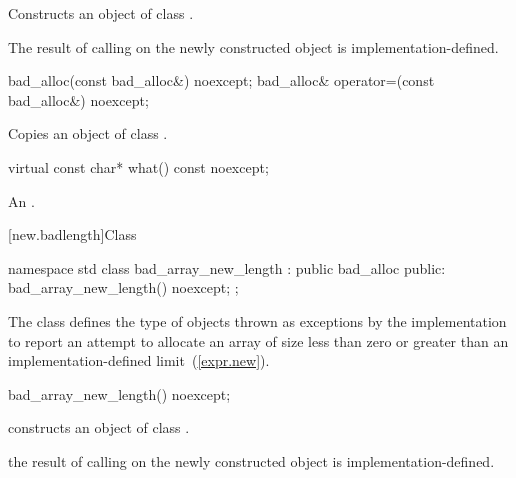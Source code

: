 \begin{itemdescr}
\pnum
\effects
Constructs an object of class
.

\pnum
\notes
The result of calling
on the newly constructed object is implementation-defined.
\end{itemdescr}

%
%
%
\begin{itemdecl}
    bad_alloc(const bad_alloc&) noexcept;
    bad_alloc& operator=(const bad_alloc&) noexcept;
\end{itemdecl}

\begin{itemdescr}
\pnum
\effects
Copies an object of class
.
\end{itemdescr}

%
\begin{itemdecl}
virtual const char* what() const noexcept;
\end{itemdecl}

\begin{itemdescr}
\pnum
\returns
{}%
An  \ntbs.
\end{itemdescr}

%
[new.badlength]{Class }

\begin{codeblock}
namespace std {
  class bad_array_new_length : public bad_alloc {
  public:
    bad_array_new_length() noexcept;
  };
}
\end{codeblock}

\pnum
The class  defines the type of objects thrown as
exceptions by the implementation to report an attempt to allocate an array of size
less than zero or
greater than an implementation-defined limit~(\ref{expr.new}).

%
\begin{itemdecl}
bad_array_new_length() noexcept;
\end{itemdecl}

\begin{itemdescr}
\pnum
\effects constructs an object of class .

\pnum
\remarks the result of calling  on the newly constructed object is
implementation-defined.
\end{itemdescr}

